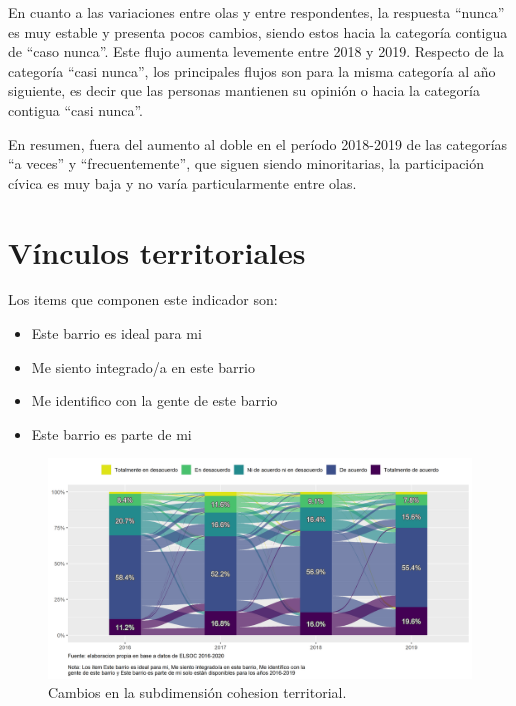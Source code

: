 \documentclass[
  12pt,
]{book}
\begin{document}
En cuanto a las variaciones entre olas y entre respondentes, la respuesta ``nunca'' es muy estable y presenta pocos cambios, siendo estos hacia la categoría contigua de ``caso nunca''. Este flujo aumenta levemente entre 2018 y 2019. Respecto de la categoría ``casi nunca'', los principales flujos son para la misma categoría al año siguiente, es decir que las personas mantienen su opinión o hacia la categoría contigua ``casi nunca''.

En resumen, fuera del aumento al doble en el período 2018-2019 de las categorías ``a veces'' y ``frecuentemente'', que siguen siendo minoritarias, la participación cívica es muy baja y no varía particularmente entre olas.

\hypertarget{vuxednculos-territoriales}{%
\section{Vínculos territoriales}\label{vuxednculos-territoriales}}

Los items que componen este indicador son:

\begin{itemize}
\item
  Este barrio es ideal para mi
\item
  Me siento integrado/a en este barrio
\item
  Me identifico con la gente de este barrio
\item
  Este barrio es parte de mi
\end{itemize}

\begin{figure}[H]

{\centering \includegraphics[width=1\linewidth,height=1\textheight]{output/graphs/alluvial_cohesion_territorial} 

}

\caption{Cambios en la subdimensión cohesion territorial.}\label{fig:alluvial-cohesion-territorial}
\end{figure}
\end{document}
